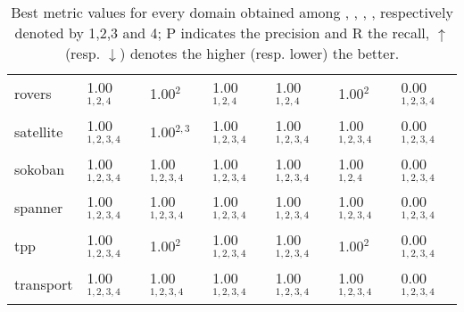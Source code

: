 \begin{table}[b!]
{\begin{tabular}{|l|l|l|l|l|l|l|}
rovers &1.00$^{1,2,4}$ &1.00$^{2}$ &1.00$^{1,2,4}$ &1.00$^{1,2,4}$ &1.00$^{2}$ &0.00$^{1,2,3,4}$ \\
satellite &1.00$^{1,2,3,4}$ &1.00$^{2,3}$ &1.00$^{1,2,3,4}$ &1.00$^{1,2,3,4}$ &1.00$^{1,2,3,4}$ &0.00$^{1,2,3,4}$ \\
sokoban &1.00$^{1,2,3,4}$ &1.00$^{1,2,3,4}$ &1.00$^{1,2,3,4}$ &1.00$^{1,2,3,4}$ &1.00$^{1,2,4}$ &0.00$^{1,2,3,4}$ \\
spanner &1.00$^{1,2,3,4}$ &1.00$^{1,2,3,4}$ &1.00$^{1,2,3,4}$ &1.00$^{1,2,3,4}$ &1.00$^{1,2,3,4}$ &0.00$^{1,2,3,4}$ \\
tpp &1.00$^{1,2,3,4}$ &1.00$^{2}$ &1.00$^{1,2,3,4}$ &1.00$^{1,2,3,4}$ &1.00$^{2}$ &0.00$^{1,2,3,4}$ \\
transport &1.00$^{1,2,3,4}$ &1.00$^{1,2,3,4}$ &1.00$^{1,2,3,4}$ &1.00$^{1,2,3,4}$ &1.00$^{1,2,3,4}$ &0.00$^{1,2,3,4}$ \\
\hline
\end{tabular}
}
\caption{ Best metric values for every domain obtained among \sam, \offlam, \rosame, \nolam, respectively denoted by 1,2,3 and 4; P indicates the precision and R the recall, $\uparrow$ (resp. $\downarrow$) denotes the higher (resp. lower) the better. 
}
\label{tab:best}
\end{table}




